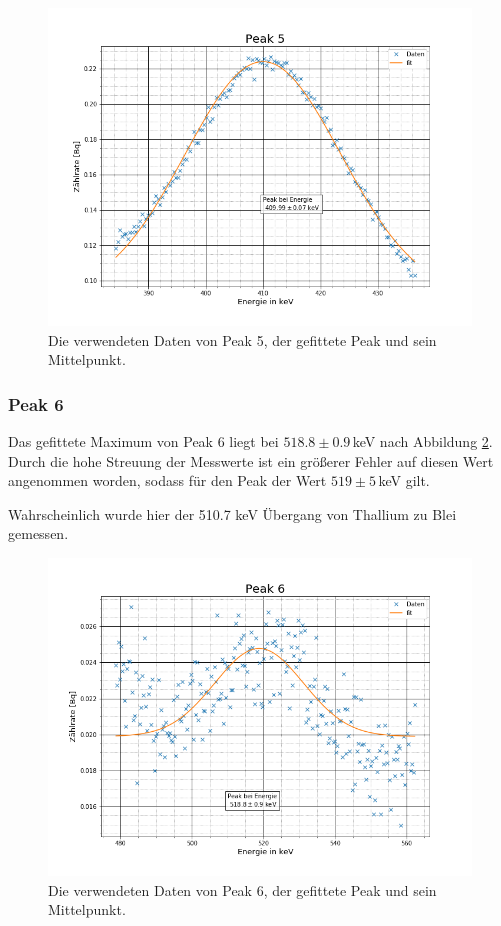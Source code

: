 \begin{figure}[h]
	\centering
	\includegraphics[scale=0.7]{Bilder/Anhang/P5}
	\caption[Thorium Peak 5]{\small Die verwendeten Daten von Peak 5, der gefittete Peak und sein Mittelpunkt.}
	\label{p5}
\end{figure}
\FloatBarrier
\subsubsection{Peak 6}
Das gefittete Maximum von Peak 6 liegt bei $518.8\pm0.9\,$keV nach Abbildung \ref{p6}. Durch die hohe Streuung der Messwerte ist ein größerer Fehler auf diesen Wert angenommen worden, sodass für den Peak der Wert $519\pm5\,$keV gilt.\par
Wahrscheinlich wurde hier der 510.7 keV \cite{Thallium} Übergang von Thallium zu Blei gemessen.

\begin{figure}[h]
	\centering
	\includegraphics[scale=0.7]{Bilder/Anhang/P6}
	\caption[Thorium Peak 6]{\small Die verwendeten Daten von Peak 6, der gefittete Peak und sein Mittelpunkt.}
	\label{p6}
\end{figure}
\FloatBarrier
